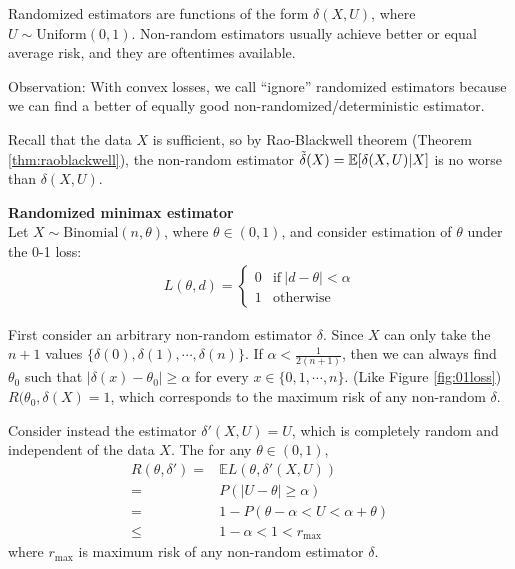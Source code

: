 Randomized estimators are functions of the form $\delta(X,U)$, where $U\sim\text{Uniform}(0,1)$.
Non-random estimators usually achieve better or equal average risk, and they are oftentimes available.

Observation: With convex losses, we call ``ignore'' randomized estimators 
because we can find a better of equally good non-randomized/deterministic estimator.

Recall that the data $X$ is sufficient,
so by Rao-Blackwell theorem (Theorem \ref{thm:raoblackwell}), 
the non-random estimator $\Tilde{\delta}(X)=\mathbb{E}[\delta(X,U)|X]$
is no worse than $\delta(X,U)$.

\begin{example}
    \textbf{Randomized minimax estimator}\\
    Let $X\sim\text{Binomial}(n,\theta)$,
    where $\theta\in(0,1)$, and consider estimation of $\theta$ under the 0-1 loss:
    \begin{gather}
        L(\theta,d)=\left\{\begin{array}{ll}
            0 & \text{if}~|d-\theta|<\alpha \\
            1 & \text{otherwise}
        \end{array}\right.
    \end{gather}

    First consider an arbitrary non-random estimator $\delta$.
    Since $X$ can only take the $n+1$ values $\{\delta(0),\delta(1),\cdots,\delta(n)\}$.
    If $\alpha<\frac{1}{2(n+1)}$, then we can always find $\theta_0$ 
    such that $|\delta(x)-\theta_0|\geq\alpha$ for every $x\in\{0,1,\cdots,n\}$. (Like Figure \ref{fig:01loss})
    $R(\theta_0,\delta(X)=1$, which corresponds to the maximum risk of any non-random $\delta$.

    Consider instead the estimator $\delta'(X,U)=U$,
    which  is completely random and independent of the data $X$.
    The for any $\theta\in(0,1)$,
    \begin{align}
        R(\theta,\delta')
        =& \mathbb{E}L(\theta,\delta'(X,U))\\
        =& P(|U-\theta|\geq\alpha)\\
        =& 1-P(\theta-\alpha<U<\alpha+\theta)\\
        \leq & 1-\alpha<1<r_\text{max}
    \end{align}
    where $r_\text{max}$ is maximum risk of any non-random estimator $\delta$.
\end{example}

